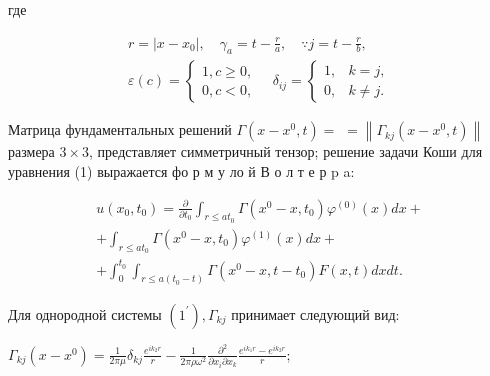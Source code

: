 \documentclass[10pt]{article}
\begin{document}
где



\[

\begin{gathered}

r=\left|x-x_{0}\right|, \quad \gamma_{a}=t-\frac{r}{a}, \quad \because j=t-\frac{r}{b}, \\

\varepsilon(c)=\left\{\begin{array}{ll}

1, c \geqslant 0, \\

0, c<0,

\end{array} \quad \delta_{i j}= \begin{cases}1, & k=j, \\

0, & k \neq j .\end{cases} \right.

\end{gathered}

\]



Матрица фундаментальных решений $\Gamma\left(x-x^{0}, t\right)=$ $=\left\|\Gamma_{k j}\left(x-x^{0}, t\right)\right\|$ размера $3 \times 3$, представляет симметричный тензор; решение задачи Коши для уравнения (1) выражается фо р м у ло й В о л т е р p a:



\[

\begin{gathered}

u\left(x_{0}, t_{0}\right)=\frac{\partial}{\partial t_{0}} \int_{r \leqslant a t_{0}} \Gamma\left(x^{0}-x, t_{0}\right) \varphi^{(0)}(x) d x+ \\

+\int_{r \leqslant a t_{0}} \Gamma\left(x^{0}-x, t_{0}\right) \varphi^{(1)}(x) d x+ \\

+\int_{0}^{t_{0}} \int_{r \leqslant a\left(t_{0}-t\right)} \Gamma\left(x^{0}-x, t-t_{0}\right) F(x, t) d x d t .

\end{gathered}

\]



Для однородной системы $\left(1^{\prime}\right), \Gamma_{k j}$ принимает следующий вид:



$\Gamma_{k j}\left(x-x^{0}\right)=\frac{1}{2 \pi \mu} \delta_{k j} \frac{e^{i k_{2} r}}{r}-\frac{1}{2 \pi \rho \omega^{2}} \frac{\partial^{2}}{\partial x_{i} \partial x_{k}} \frac{e^{i k_{1} r}-e^{i k_{2} r}}{r} ;$
\end{document}
